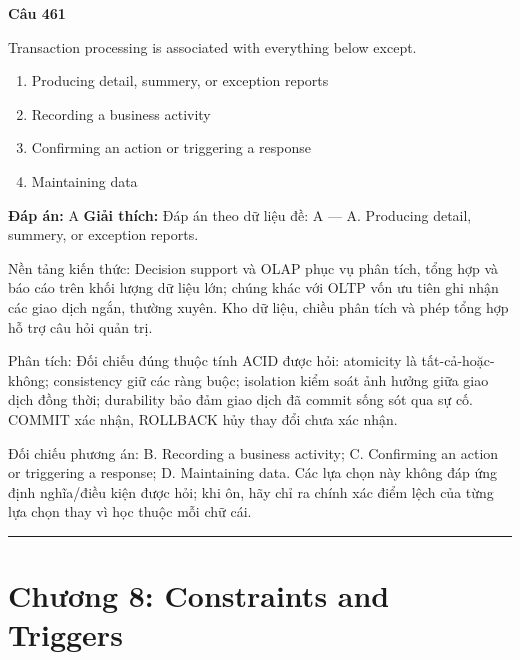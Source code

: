 \documentclass[11pt,a4paper]{article}
\newenvironment{question}[1]{%
  \par\vspace{1em}\noindent\textbf{\large Câu #1}\par\vspace{0.4em}
}{%
  \par\vspace{1em}\hrule\vspace{0.6em}
}
\newenvironment{choices}{%
  \begin{enumerate}[label=\textbf{\Alph*.},leftmargin=2.2em,itemsep=2pt,topsep=3pt]
}{%
  \end{enumerate}
}
\newcommand{\choice}{\item}
\begin{document}
\begin{question}{461}
Transaction processing is associated with everything below except.
\begin{choices}
\choice Producing detail, summery, or exception reports
\choice Recording a business activity
\choice Confirming an action or triggering a response
\choice Maintaining data
\end{choices}
\textbf{Đáp án:} A
\textbf{Giải thích:} Đáp án theo dữ liệu đề: A — A. Producing detail, summery, or exception reports.

Nền tảng kiến thức: Decision support và OLAP phục vụ phân tích, tổng hợp và báo cáo trên khối lượng dữ liệu lớn; chúng khác với OLTP vốn ưu tiên ghi nhận các giao dịch ngắn, thường xuyên. Kho dữ liệu, chiều phân tích và phép tổng hợp hỗ trợ câu hỏi quản trị.

Phân tích: Đối chiếu đúng thuộc tính ACID được hỏi: atomicity là tất-cả-hoặc-không; consistency giữ các ràng buộc; isolation kiểm soát ảnh hưởng giữa giao dịch đồng thời; durability bảo đảm giao dịch đã commit sống sót qua sự cố. COMMIT xác nhận, ROLLBACK hủy thay đổi chưa xác nhận.

Đối chiếu phương án: B. Recording a business activity; C. Confirming an action or triggering a response; D. Maintaining data. Các lựa chọn này không đáp ứng định nghĩa/điều kiện được hỏi; khi ôn, hãy chỉ ra chính xác điểm lệch của từng lựa chọn thay vì học thuộc mỗi chữ cái.
\end{question}


\newpage
\section*{Chương 8: Constraints and Triggers}
\end{document}
